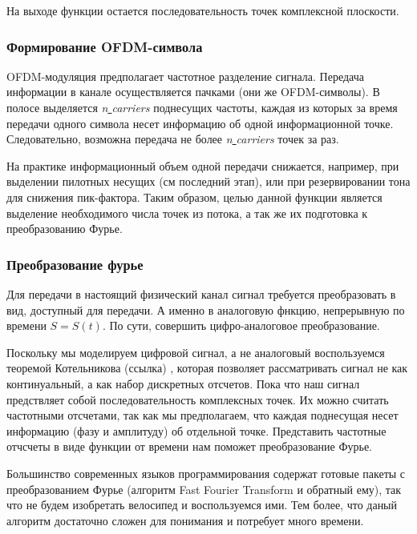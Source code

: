 \documentclass[a4paper,12pt]{article}
\begin{document}
 На выходе функции остается последовательность точек комплексной плоскости. 





\subsubsection*{Формирование OFDM-символа}

OFDM-модуляция предполагает частотное разделение сигнала. 
Передача информации в канале осуществляется пачками (они же OFDM-символы). 
В полосе выделяется  \textit{n\underline{ }carriers} поднесущих частоты, каждая из которых за время передачи одного символа несет информацию об одной информационной точке.
Следовательно, возможна передача не более  \textit{n\underline{ }carriers} точек за раз. 

На практике информационный объем одной передачи снижается, например, при выделении пилотных несущих (см последний этап), или при резервировании тона для снижения пик-фактора. 
Таким образом, целью данной функции является выделение необходимого числа точек из потока, а так же их подготовка к преобразованию Фурье. 
 
 \subsubsection*{Преобразование фурье}
 
Для передачи в настоящий физический канал сигнал требуется преобразовать в вид, доступный для передачи. 
А именно в аналоговую фнкцию, непрерывную по времени $S = S(t)$. 
По сути, совершить цифро-аналоговое преобразование. 

Поскольку мы моделируем цифровой сигнал, а не аналоговый 
воспользуемся теоремой Котельникова  (ссылка)
, которая позволяет рассматривать сигнал не как континуальный, а как набор дискретных отсчетов. 
Пока что наш сигнал предствляет собой последовательность комплексных точек. 
Их можно считать частотными отсчетами, так как мы предполагаем, что каждая поднесущая несет информацию (фазу и амплитуду) об отдельной точке.  
Представить частотные отчсчеты в виде функции от времени нам поможет преобразование Фурье.

Большинство современных языков программирования содержат готовые пакеты с преобразованием Фурье (алгоритм  Fast Fourier Transform и обратный ему), так что не будем изобретать велосипед и воспользуемся ими.
Тем более, что даный алгоритм достаточно сложен для понимания и потребует много времени. 
\end{document}
